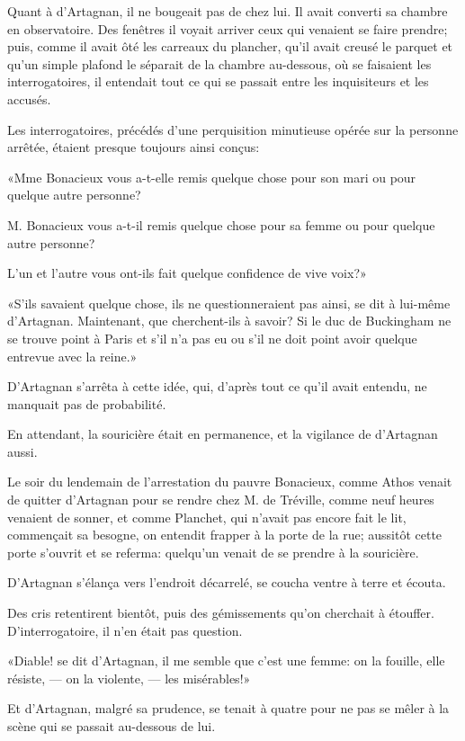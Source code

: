 Quant à d'Artagnan, il ne bougeait pas de chez lui. Il avait converti sa chambre en observatoire. Des fenêtres il voyait arriver ceux qui venaient se faire prendre; puis, comme il avait ôté les carreaux du plancher, qu'il avait creusé le parquet et qu'un simple plafond le séparait de la chambre au-dessous, où se faisaient les interrogatoires, il entendait tout ce qui se passait entre les inquisiteurs et les accusés. 

Les interrogatoires, précédés d'une perquisition minutieuse opérée sur la personne arrêtée, étaient presque toujours ainsi conçus: 

«Mme Bonacieux vous a-t-elle remis quelque chose pour son mari ou pour quelque autre personne? 

\speak  M. Bonacieux vous a-t-il remis quelque chose pour sa femme ou pour quelque autre personne? 

\speak  L'un et l'autre vous ont-ils fait quelque confidence de vive voix?» 

«S'ils savaient quelque chose, ils ne questionneraient pas ainsi, se dit à lui-même d'Artagnan. Maintenant, que cherchent-ils à savoir? Si le duc de Buckingham ne se trouve point à Paris et s'il n'a pas eu ou s'il ne doit point avoir quelque entrevue avec la reine.» 

D'Artagnan s'arrêta à cette idée, qui, d'après tout ce qu'il avait entendu, ne manquait pas de probabilité. 

En attendant, la souricière était en permanence, et la vigilance de d'Artagnan aussi. 

Le soir du lendemain de l'arrestation du pauvre Bonacieux, comme Athos venait de quitter d'Artagnan pour se rendre chez M. de Tréville, comme neuf heures venaient de sonner, et comme Planchet, qui n'avait pas encore fait le lit, commençait sa besogne, on entendit frapper à la porte de la rue; aussitôt cette porte s'ouvrit et se referma: quelqu'un venait de se prendre à la souricière. 

D'Artagnan s'élança vers l'endroit décarrelé, se coucha ventre à terre et écouta. 

Des cris retentirent bientôt, puis des gémissements qu'on cherchait à étouffer. D'interrogatoire, il n'en était pas question. 

«Diable! se dit d'Artagnan, il me semble que c'est une femme: on la fouille, elle résiste, --- on la violente, --- les misérables!» 

Et d'Artagnan, malgré sa prudence, se tenait à quatre pour ne pas se mêler à la scène qui se passait au-dessous de lui. 

